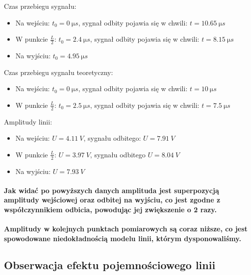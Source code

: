 \documentclass[a4paper,12pt]{article}
\begin{document}
\begin{justify}
Czas przebiegu sygnału: \\
\begin{itemize}
\item Na wejściu: $t_{0} = \SI{0}{\micro s}$, sygnał odbity pojawia się w chwili: $t = \SI{10.65}{\micro s}$
\item W punkcie $\frac{L}{2}$: $t_{0} = \SI{2.4}{\micro s} $, sygnał odbity pojawia się w chwili: $t = \SI{8.15}{\micro s}$
\item Na wyjściu: $t_{0} = \SI{4.95}{\micro s}$
\end{itemize}

Czas przebiegu sygnału teoretyczny: \\
\begin{itemize}
\item Na wejściu: $t_{0} = \SI{0}{\micro s}$, sygnał odbity pojawia się w chwili: $t = \SI{10}{\micro s}$
\item W punkcie $\frac{L}{2}$: $t_{0} = \SI{2.5}{\micro s} $, sygnał odbity pojawia się w chwili: $t = \SI{7.5}{\micro s}$
\end{itemize}

Amplitudy linii: \\
\begin{itemize}
\item Na wejściu: $U = \SI{4.11}{V}$, sygnału odbitego: $U = \SI{7.91}{V}$
\item W punkcie $\frac{L}{2}$: $U = \SI{3.97}{V} $, sygnału odbitego $U = \SI{8.04}{V}$
\item Na wyjściu: $U = \SI{7.93}{V}$
\end{itemize}

\paragraph{Jak widać po powyższych danych amplituda jest superpozycją amplitudy wejściowej oraz odbitej na wyjściu, co jest zgodne z współczynnikiem odbicia, powodując jej zwiększenie o 2 razy. \\ \, \\
Amplitudy w kolejnych punktach pomiarowych są coraz niższe, co jest spowodowane niedokładnością modelu linii, którym dysponowaliśmy. }

\newpage

\subsection{Obserwacja efektu pojemnościowego linii}


\end{justify}
\end{document}
